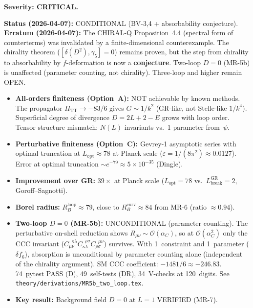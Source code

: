 \documentclass[12pt,a4paper]{article}
\begin{document}
\textbf{Severity: CRITICAL.}

\textbf{Status (2026-04-07):} \textcolor{near}{CONDITIONAL (BV-3,4 + absorbability conjecture).}
\textbf{Erratum (2026-04-07):} The CHIRAL-Q Proposition~4.4 (spectral form
of counterterms) was invalidated by a finite-dimensional counterexample.
The chirality theorem ($[\delta(D^2), \gamma_5] = 0$) remains proven, but
the step from chirality to absorbability by $f$-deformation is now a
\textbf{conjecture}. Two-loop $D = 0$ (MR-5b) is unaffected (parameter
counting, not chirality).  Three-loop and higher remain OPEN.
\begin{itemize}
  \item \textbf{All-orders finiteness (Option~A):} NOT achievable by known methods.
    The propagator $\Pi_{\mathrm{TT}} \to -83/6$ gives $G \sim 1/k^2$ (GR-like,
    not Stelle-like $1/k^4$). Superficial degree of divergence $D = 2L+2-E$ grows
    with loop order. Tensor structure mismatch: $N(L)$ invariants vs.\ 1 parameter
    from~$\psi$.
  \item \textbf{Perturbative finiteness (Option~C):} Gevrey-1 asymptotic series
    with optimal truncation at $L_{\mathrm{opt}} \approx 78$ at Planck scale
    ($\varepsilon = 1/(8\pi^2) \approx 0.0127$). Error at optimal truncation
    $\sim e^{-79} \approx 5 \times 10^{-35}$ (Dingle).
  \item \textbf{Improvement over GR:} $39\times$ at Planck scale
    ($L_{\mathrm{opt}} = 78$ vs.\ $L_{\mathrm{break}}^{\mathrm{GR}} = 2$,
    Goroff--Sagnotti).
  \item \textbf{Borel radius:} $R_B^{\mathrm{loop}} \approx 79$, close to
    $R_B^{\mathrm{curv}} \approx 84$ from MR-6 (ratio $\approx 0.94$).
  \item \textbf{Two-loop $D=0$ (MR-5b):} \textcolor{proven}{UNCONDITIONAL (parameter counting).}
    The perturbative on-shell reduction shows $R_{\mu\nu}\sim\mathcal{O}(\alpha_C)$,
    so at $\mathcal{O}(\alpha_C^2)$ only the CCC invariant
    ($C_{\mu\nu}^{\;\;\kappa\lambda}C_{\kappa\lambda}^{\;\;\rho\sigma}
    C_{\rho\sigma}^{\;\;\mu\nu}$) survives.  With 1~constraint and 1~parameter
    ($\delta f_6$), absorption is unconditional by parameter counting alone
    (independent of the chirality argument).
    SM CCC coefficient: $-1481/6\approx -246.83$.
    74~pytest PASS (D), 49~self-tests (DR), 34~V-checks at 120~digits.
    See \texttt{theory/derivations/MR5b\_two\_loop.tex}.
  \item \textbf{Key result:} Background field $D = 0$ at $L = 1$ VERIFIED (MR-7).

\end{itemize}
\end{document}

